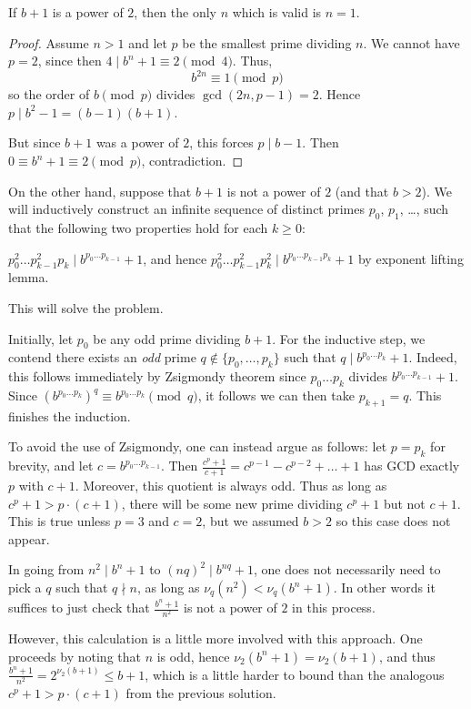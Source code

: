 \documentclass[11pt]{scrartcl}
\begin{document}
\begin{claim*}
  If $b+1$ is a power of $2$,
  then the only $n$ which is valid is $n = 1$.
\end{claim*}
\begin{proof}
  Assume $n > 1$ and let $p$ be the smallest prime dividing $n$.
  We cannot have $p=2$, since then $4 \mid b^n+1 \equiv 2 \pmod 4$.
  Thus, \[ b^{2n} \equiv 1 \pmod p \]
  so the order of $b \pmod p$ divides $\gcd(2n,p-1) = 2$.
  Hence $p \mid b^2-1 = (b-1)(b+1)$.

  But since $b+1$ was a power of $2$,
  this forces $p \mid b-1$.
  Then $0 \equiv b^n + 1 \equiv 2 \pmod p$, contradiction.
\end{proof}

On the other hand, suppose that $b+1$ is not a power of $2$
(and that $b > 2$).
We will inductively construct an infinite sequence
of distinct primes $p_0$, $p_1$, \dots,
such that the following two properties hold for each $k \ge 0$:
\begin{itemize}
  \ii $p_0^2 \dots p_{k-1}^2 p_k \mid b^{p_0 \dots p_{k-1}} + 1$,
  \ii and hence $p_0^2 \dots p_{k-1}^2 p_k^2 \mid b^{p_0 \dots p_{k-1} p_k} + 1$
  by exponent lifting lemma.
\end{itemize}
This will solve the problem.

Initially, let $p_0$ be any odd prime dividing $b+1$.
For the inductive step, we contend there exists an
\emph{odd} prime $q \notin \{p_0, \dots, p_k\}$
such that $q \mid b^{p_0 \dots p_k} + 1$.
Indeed, this follows immediately by Zsigmondy theorem
since $p_0 \dots p_k$ divides $b^{p_0 \dots p_{k-1}} + 1$.
Since $(b^{p_0 \dots p_k})^q \equiv b^{p_0 \dots p_k} \pmod q$,
it follows we can then take $p_{k+1} = q$.
This finishes the induction.

To avoid the use of Zsigmondy,
one can instead argue as follows:
let $p = p_k$ for brevity, and let $c = b^{p_0 \dots p_{k-1}}$.
Then $\frac{c^p+1}{c+1} = c^{p-1} - c^{p-2} + \dots + 1$
has GCD exactly $p$ with $c+1$.
Moreover, this quotient is always odd.
Thus as long as $c^p + 1 > p \cdot (c+1)$,
there will be some new prime dividing $c^p+1$ but not $c+1$.
This is true unless $p = 3$ and $c = 2$,
but we assumed $b > 2$ so this case does not appear.

\begin{remark*}
  In going from $n^2 \mid b^{n}+1$ to $(nq)^2 \mid b^{nq} + 1$,
  one does not necessarily need to pick a $q$ such that
  $q \nmid n$, as long as $\nu_q(n^2) < \nu_q(b^n+1)$.
  In other words it suffices to just
  check that $\frac{b^n+1}{n^2}$ is not a power of $2$ in this process.

  However, this calculation is a little more involved with this approach.
  One proceeds by noting that $n$ is odd,
  hence $\nu_2(b^n+1) = \nu_2(b+1)$,
  and thus $\frac{b^n+1}{n^2} = 2^{\nu_2(b+1)} \le b+1$,
  which is a little harder to bound than the analogous
  $c^p+1 > p \cdot (c+1)$ from the previous solution.
\end{remark*}
\end{document}
